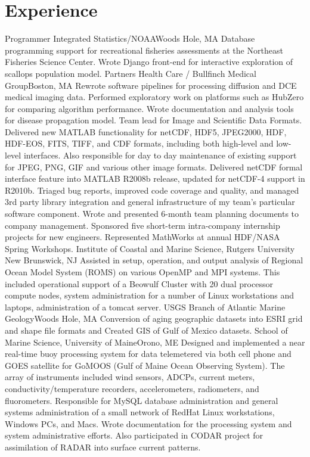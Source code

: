 \documentclass[11pt]{moderncv}  %
\begin{document}
\section{Experience}
 {Programmer}
    {Integrated Statistics/NOAA}{Woods Hole, MA}{}{
    Database programming support for recreational fisheries assessments
    at the Northeast Fisheries Science Center. Wrote Django front-end
    for interactive exploration of scallops population model.}
    {Partners Health Care / Bullfinch Medical Group}{Boston, MA}{}{
    Rewrote software pipelines for processing diffusion and DCE medical
    imaging data.  Performed exploratory work on platforms such as
    HubZero  for comparing algorithm performance. Wrote documentation
    and analysis tools for disease propagation model.}
    {Team lead for Image and Scientific Data Formats.  Delivered
    new MATLAB functionality for netCDF, HDF5, JPEG2000, HDF,
    HDF-EOS, FITS, TIFF, and CDF formats, including both high-level
    and low-level interfaces.  Also responsible for day to day
    maintenance of existing support for JPEG, PNG, GIF and various
    other image formats.  Delivered netCDF formal interface feature
    into MATLAB R2008b release, updated for netCDF-4 support in
    R2010b. Triaged bug reports, improved code coverage and quality,
    and managed 3rd party library integration and general infrastructure
    of my team's particular software component.  Wrote and presented
    6-month team planning documents to company management.  Sponsored
    five short-term intra-company internship projects for new
    engineers.  Represented MathWorks at annual HDF/NASA Spring
    Workshops.}
    {Institute of Coastal and Marine Science, Rutgers University}
    {New Brunswick, NJ}{} {
    Assisted in setup,  operation, and output analysis  of Regional
    Ocean Model System (ROMS) on various OpenMP and MPI systems.
    This included operational support of a Beowulf Cluster with 20
    dual processor compute nodes, system administration for a number
    of Linux workstations and laptops, administration of a tomcat
    server.}
    {USGS Branch of Atlantic Marine Geology}{Woods Hole, MA}{}{
    Conversion of aging geographic datasets into ESRI grid and shape
    file formats and Created GIS of Gulf of Mexico datasets.}
    {School of Marine Science, University of Maine}{Orono, ME}{}{
    Designed and implemented a near real-time buoy processing system
    for data telemetered via both cell phone and GOES satellite for
    GoMOOS (Gulf of Maine Ocean Observing System).   The array of
    instruments included wind sensors, ADCPs, current meters,
    conductivity/temperature recorders, accelerometers, radiometers,
    and fluorometers.   Responsible for MySQL database administration
    and general systems administration of a small network of RedHat
    Linux workstations, Windows PCs, and Macs.   Wrote documentation
    for the processing system and system administrative efforts.
    Also participated in CODAR project for assimilation of RADAR
    into surface current patterns.}
\end{document}
